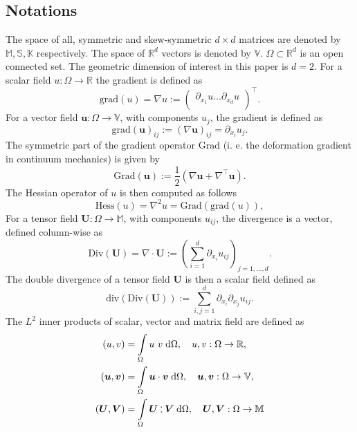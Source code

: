 \documentclass{ifacconf}
\def\onedot{$\mathsurround0pt\ldotp$}
\def\cddot{%
	\mathbin{\vcenter{\baselineskip.67ex
			\hbox{\onedot}\hbox{\onedot}}%
}}
\begin{document}
\subsection{Notations}
The space of all, symmetric and skew-symmetric $d\times d$ matrices are denoted by $\mathbb{M}, \mathbb{S}, \mathbb{K}$ respectively. The space of $\mathbb{R}^d$ vectors is denoted by $\mathbb{V}$. $\Omega \subset \mathbb{R}^d$ is an open connected set. The geometric dimension of interest in this paper is $d=2$. For a scalar field $u: \Omega \rightarrow \mathbb{R}$ the gradient is defined as 
\begin{equation*}
\mathrm{grad}(u) =  \nabla u := \begin{pmatrix}
\partial_{x_1} u \dots \partial_{x_d} u \\
\end{pmatrix}^\top.
\end{equation*}
For a vector field $\bm{u}: \Omega \rightarrow \mathbb{V}$, with components $u_j$, the gradient is defined as
\begin{equation*}
\mathrm{grad}(\bm{u})_{i j}:= (\nabla \bm{u})_{ij} = \partial_{x_i} u_j.
\end{equation*}
The symmetric part of the gradient operator $\mathrm{Grad}$ (i. e. the deformation gradient in continuum mechanics) is given by
\begin{equation*}
\mathrm{Grad}(\bm{u}) := \frac{1}{2} \left(\nabla \bm{u} + \nabla^\top \bm{u} \right).
\end{equation*}
The Hessian operator of $u$ is then computed as follows
\begin{equation*}
\mathrm{Hess}(u) = \nabla^2 u = \mathrm{Grad}(\mathrm{grad}(u)),
\end{equation*}
For a tensor field $\bm{U}: \Omega \rightarrow \mathbb{M}$, with components $u_{ij}$, the divergence is a vector, defined column-wise as
\begin{equation*}
\mathrm{Div}(\bm U) = \nabla \cdot \bm{U} := \left( \sum_{i = 1}^d \partial_{x_i} u_{ij} \right)_{j = 1, \dots, d}.
\end{equation*}
The double divergence of a tensor field $\bm{U}$ is then a scalar field defined as
\begin{equation*}
\mathrm{div}(\mathrm{Div}(\bm U)):= \sum_{i, j = 1}^d \partial_{x_i} \partial_{x_j} u_{ij}.
\end{equation*}
The $L^2$ inner products of scalar, vector and matrix field are defined as
\begin{align*}
	(u, v) &= \int_{\Omega} u \ v \d\Omega, \quad u, v : \Omega \rightarrow \mathbb{R}, \\
	(\bm{u}, \bm{v}) &= \int_{\Omega} \bm{u} \cdot \bm{v} \d\Omega, \quad \bm{u}, \bm{v} : \Omega \rightarrow \mathbb{V}, \\
	(\bm{U}, \bm{V}) &= \int_{\Omega} \bm{U} \cddot \bm{V} \d\Omega, \quad \bm{U}, \bm{V} : \Omega \rightarrow \mathbb{M}
\end{align*}
\end{document}
